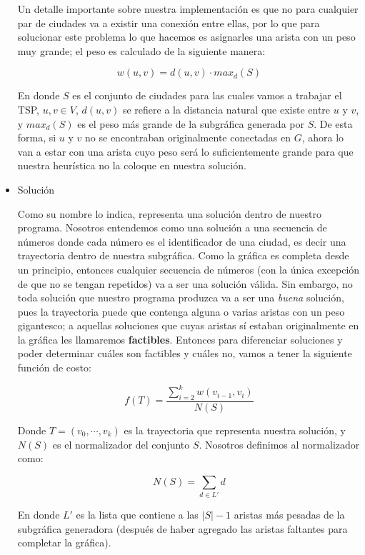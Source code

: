 \documentclass{article}
\newcommand{\tbf}[1]{\textbf{#1}}
\newcommand{\tit}[1]{\textit{#1}}
\begin{document}
\begin{itemize}
      Un detalle importante sobre nuestra implementación es que no para 
      cualquier par de ciudades va a existir una conexión entre ellas, por
      lo que para solucionar este problema lo que hacemos es asignarles
      una arista con un peso muy grande; el peso es calculado de la 
      siguiente manera:

      \[ w(u, v) = d(u, v) \cdot max_d(S) \]
      
      En donde $S$ es el conjunto de ciudades para las cuales vamos 
      a trabajar el TSP, $u, v \in V$, $d(u, v)$ se refiere a la 
      distancia natural que existe entre $u$ y $v$, y $max_d(S)$ es 
      el peso más grande de la subgráfica generada por $S$. De esta forma,
      si $u$ y $v$ no se encontraban originalmente conectadas en 
      $G$, ahora lo van a estar con una arista cuyo peso será lo 
      suficientemente grande para que nuestra heurística no la coloque 
      en nuestra solución.
      
    \item Solución
      
      Como su nombre lo indica, representa una solución dentro de nuestro 
      programa. Nosotros entendemos como una solución a una secuencia de 
      números donde cada número es el identificador de una ciudad, es decir
      una trayectoria dentro de nuestra subgráfica. Como la gráfica es 
      completa desde un principio, entonces cualquier secuencia de números 
      (con la única excepción de que no se tengan repetidos) va a ser una 
      solución válida. Sin embargo, no toda solución que nuestro programa
      produzca va a ser una \tit{buena} solución, pues la trayectoria puede 
      que contenga alguna o varias aristas con un peso gigantesco; a 
      aquellas soluciones que cuyas aristas sí estaban originalmente en la 
      gráfica les llamaremos \tbf{factibles}. Entonces para diferenciar 
      soluciones y poder determinar cuáles son factibles y cuáles no, 
      vamos a tener la siguiente función de costo:

      \[ f(T) = \frac{\sum_{i=2}^k w(v_{i-1}, v_i)}{N(S)} \]

      Donde $T = (v_0, \cdots, v_k)$ es la trayectoria que representa
      nuestra solución, y $N(S)$ es el normalizador del conjunto $S$.
      Nosotros definimos al normalizador como:
      
      \[ N(S) = \sum_{d \in L'} d \]
      
      En donde $L'$ es la lista que contiene a las $|S|-1$ aristas 
      más pesadas de la subgráfica generadora (después de haber 
      agregado las aristas faltantes para completar la gráfica).


\end{itemize}
\end{document}

